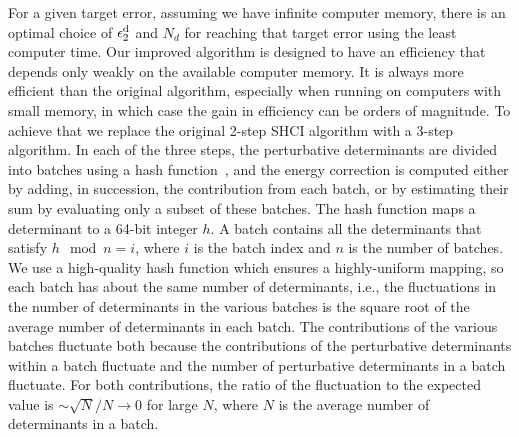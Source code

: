 \documentclass[%
reprint,
 superscriptaddress,
 amsmath,amssymb,
 aps,
]{revtex4-1}
\begin{document}
For a given target error, assuming we have infinite computer memory, there is an optimal choice of $\epsilon_2^{\rm d}$ and $N_d$
for reaching that target error using the least computer time.
Our improved algorithm is designed to have an efficiency that depends only weakly on the available computer memory.
It is always more efficient than the original algorithm, especially when running on computers with small memory, in which case the
gain in efficiency can be orders of magnitude.
To achieve that we replace the original 2-step SHCI algorithm with a 3-step algorithm.
In each of the three steps, the perturbative determinants are divided into batches using a hash function~\cite{Jen-Hash-97, Boost-2012},
and the energy correction is computed either by adding, in succession, the contribution from each batch,
or by estimating their sum by evaluating
only a subset of these batches.
{\color{black}
The hash function maps a determinant to a 64-bit integer $h$.
A batch contains all the determinants that satisfy $h \mod n = i$, where $i$ is the batch index and $n$ is the number of batches.
We use a high-quality hash function which ensures a highly-uniform mapping,
so each batch has about the same number of determinants, i.e., the fluctuations in the number of
determinants in the various batches is the square root of the average number of determinants in each batch.
The contributions of the various batches fluctuate both because the contributions of the perturbative
determinants within a batch fluctuate and the number of perturbative determinants in a batch fluctuate.
For both contributions, the ratio of the fluctuation to the expected value is $\sim\sqrt{N}/N\to0$ for large $N$,
where $N$ is the average number of determinants in a batch.
}
\end{document}
